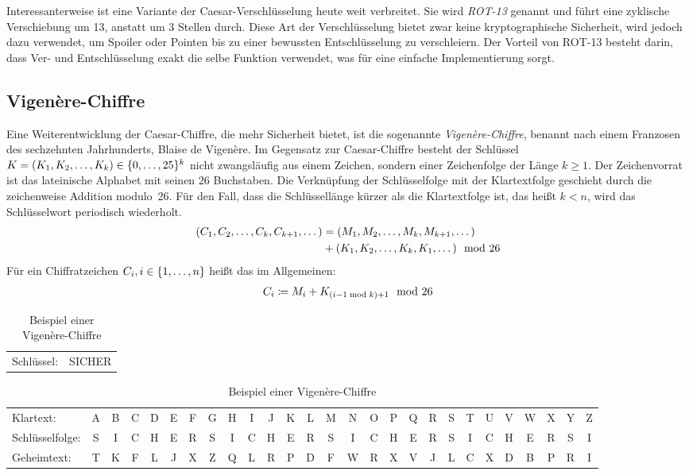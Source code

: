 Interessanterweise ist eine Variante der Caesar-Verschlüsselung heute weit verbreitet. Sie wird \emph{ROT-13} genannt und führt eine zyklische Verschiebung
um 13, anstatt um 3 Stellen durch. Diese Art der Verschlüsselung bietet zwar keine kryptographische Sicherheit, wird jedoch dazu verwendet, um Spoiler oder Pointen bis zu einer bewussten Entschlüsselung zu verschleiern. Der Vorteil von ROT-13 besteht darin, dass Ver- und
Entschlüsselung exakt die selbe Funktion verwendet, was für eine einfache Implementierung sorgt.

\subsection{Vigenère-Chiffre}
\label{ssec:vigenere}
Eine Weiterentwicklung der Caesar-Chiffre, die mehr Sicherheit bietet, ist die sogenannte \emph{Vigenère-Chiffre}, benannt nach einem Franzosen des
sechzehnten Jahrhunderts, Blaise de Vigenère. Im Gegensatz zur Caesar-Chiffre besteht der Schlüssel $K = (K_{1},K_{2},\dots,K_{k}) \in \{0,\dots,25\}^{k}$ nicht zwangsläufig aus einem Zeichen, sondern einer Zeichenfolge der Länge $k \geq 1$.
Der Zeichenvorrat ist das lateinische Alphabet mit seinen 26 Buchstaben. Die Verknüpfung der Schlüsselfolge mit der Klartextfolge geschieht durch die zeichenweise Addition modulo~26. Für den Fall, dass die Schlüssellänge kürzer als die Klartextfolge ist, das heißt $k < n$, wird das Schlüsselwort periodisch wiederholt.
\begin{align*}
	\begin{split}
		(C_{1},C_{2},\dots,C_{k},C_{k+1},\dots) &= (M_{1},M_{2},\dots,M_{k},M_{k+1},\dots)\\ 
		&+ (K_{1},K_{2},\dots,K_{k},K_{1},\dots) \mod 26
	\end{split}
\end{align*}
Für ein Chiffratzeichen $C_{i}, i \in \{1,\dots,n\}$ heißt das im Allgemeinen:
\begin{align*}
	C_{i} \coloneqq M_{i} + K_{(i-1 \bmod k)+1} \mod 26
\end{align*}

\begin{table}[h]
	\centering
	\setlength{\tabcolsep}{2pt}
	\begin{tabular}{ll}
		Schlüssel: 
		& SICHER
	\end{tabular}
	\begin{tabular}{l*{26}{c}}
		Klartext:
		&A&B&C&D&E&F&G&H&I&J&K&L&M&N&O&P&Q&R&S&T&U&V&W&X&Y&Z\\
		Schlüsselfolge:
		&S&I&C&H&E&R&S&I&C&H&E&R&S&I&C&H&E&R&S&I&C&H&E&R&S&I\\
		Geheimtext:
		&T&K&F&L&J&X&Z&Q&L&R&P&D&F&W&R&X&V&J&L&C&X&D&B&P&R&I\\
	\end{tabular}
	\caption{Beispiel einer Vigenère-Chiffre}
\end{table}

